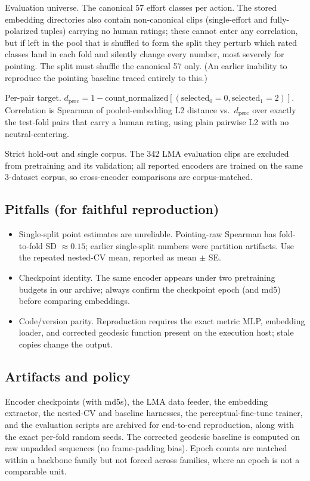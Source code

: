 \documentclass[letterpaper]{article} %
\begin{document}
{Evaluation universe.} The canonical 57 effort classes per action. The stored embedding
directories also contain non-canonical clips (single-effort and fully-polarized tuples) carrying
{no} human ratings; these cannot enter any correlation, but if left in the pool that is
shuffled to form the split they perturb which rated classes land in each fold and silently change
every number, most severely for pointing. The split must shuffle the canonical 57 only. (An
earlier inability to reproduce the pointing baseline traced entirely to this.)

{Per-pair target.} $d_{\text{perc}} = 1 - \text{count\_normalized}[(\text{selected}_0{=}0,
\text{selected}_1{=}2)]$. Correlation is Spearman of pooled-embedding L2 distance vs.\
$d_{\text{perc}}$ over exactly the test-fold pairs that carry a human rating, using plain pairwise
L2 with no neutral-centering.

{Strict hold-out and single corpus.} The 342 LMA evaluation clips are excluded from
pretraining and its validation; all reported encoders are trained on the same 3-dataset corpus, so
cross-encoder comparisons are corpus-matched.

\subsection{Pitfalls (for faithful reproduction)}
\begin{itemize}
\item {Single-split point estimates are unreliable.} Pointing-raw Spearman has fold-to-fold
SD $\approx 0.15$; earlier single-split numbers were partition artifacts. Use the repeated nested-CV
mean, reported as mean $\pm$ SE.
\item {Checkpoint identity.} The same encoder appears under two pretraining budgets in our
archive; always confirm the checkpoint epoch (and md5) before comparing embeddings.
\item {Code/version parity.} Reproduction requires the exact metric MLP, embedding loader,
and corrected geodesic function present on the execution host; stale copies change the output.
\end{itemize}

\subsection{Artifacts and policy}
Encoder checkpoints (with md5s), the LMA data feeder, the embedding extractor, the nested-CV and
baseline harnesses, the perceptual-fine-tune trainer, and the evaluation scripts are archived for
end-to-end reproduction, along with the exact per-fold random seeds. The corrected geodesic baseline
is computed on raw unpadded sequences (no frame-padding bias). Epoch counts are matched within a
backbone family but not forced across families, where an epoch is not a comparable unit.
\end{document}
